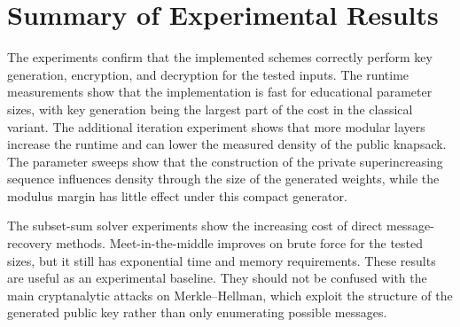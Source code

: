 \section{Summary of Experimental Results}

The experiments confirm that the implemented schemes correctly perform key
generation, encryption, and decryption for the tested inputs. The runtime
measurements show that the implementation is fast for educational parameter
sizes, with key generation being the largest part of the cost in the classical
variant. The additional iteration experiment shows that more modular layers
increase the runtime and can lower the measured density of the public knapsack.
The parameter sweeps show that the construction of the private superincreasing
sequence influences density through the size of the generated weights, while the
modulus margin has little effect under this compact generator.

The subset-sum solver experiments show the increasing cost of direct
message-recovery methods. Meet-in-the-middle improves on brute force for the
tested sizes, but it still has exponential time and memory requirements. These
results are useful as an experimental baseline. They should not be confused
with the main cryptanalytic attacks on Merkle--Hellman, which exploit the
structure of the generated public key rather than only enumerating possible
messages.
